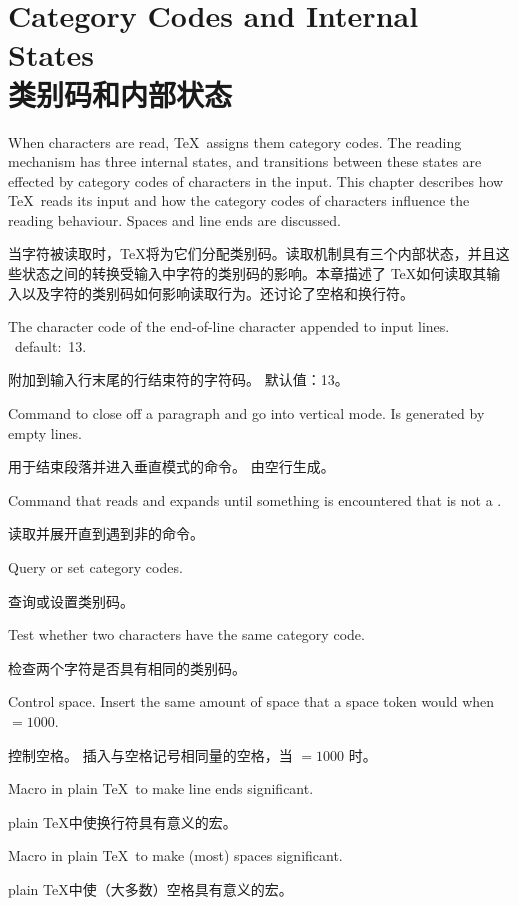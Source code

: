 

\endofchapter
\chapter{Category Codes and Internal States\\类别码和内部状态}\label{mouth}

When characters are read, 
\TeX\ assigns them
category codes. The reading mechanism has three internal
states, and transitions between these states are effected
by category codes of characters in the input.
This chapter describes how \TeX\ reads its input and
how the category codes of characters influence the
reading behaviour. Spaces and line ends are discussed.

当字符被读取时，\TeX 将为它们分配类别码。读取机制具有三个内部状态，并且这些状态之间的转换受输入中字符的类别码的影响。本章描述了 \TeX 如何读取其输入以及字符的类别码如何影响读取行为。还讨论了空格和换行符。

\begin{inventory}
\item [\cs{endlinechar}]  
      The character code of the end-of-line character 
      appended to input lines.
      \IniTeX\ default:~13.

      附加到输入行末尾的行结束符的字符码。
\IniTeX 默认值：13。
\item [\cs{par}]  
      Command to close off a paragraph and go into vertical mode.
      Is generated by empty lines.

      用于结束段落并进入垂直模式的命令。
由空行生成。
\item [\cs{ignorespaces}]   
      Command that reads and expands until something is
      encountered that is not a .

      读取并展开直到遇到非的命令。
\item [\cs{catcode}] 
      Query or set category codes.

      查询或设置类别码。
\item [\cs{ifcat}]  
      Test whether two characters have the same category code.

      检查两个字符是否具有相同的类别码。
\item [\cs{\char32}]
      Control space.
      Insert the same amount of space that a space token would
      when ${}=1000$.

      控制空格。
插入与空格记号相同量的空格，当 ${}=1000$ 时。%
\item [\cs{obeylines}]
      Macro in plain \TeX\ to make line ends significant.

      plain \TeX 中使换行符具有意义的宏。
\item [\cs{obeyspaces}]
      Macro in plain \TeX\ to make (most) spaces significant.

      plain \TeX 中使（大多数）空格具有意义的宏。
\end{inventory}


